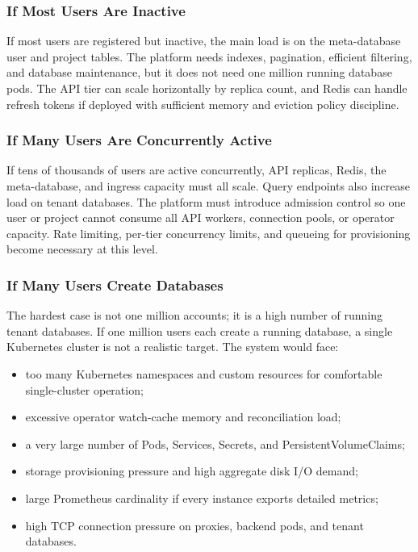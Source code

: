 \subsubsection{If Most Users Are Inactive}
If most users are registered but inactive, the main load is on the meta-database user and project tables. The platform needs indexes, pagination, efficient filtering, and database maintenance, but it does not need one million running database pods. The API tier can scale horizontally by replica count, and Redis can handle refresh tokens if deployed with sufficient memory and eviction policy discipline.

\subsubsection{If Many Users Are Concurrently Active}
If tens of thousands of users are active concurrently, API replicas, Redis, the meta-database, and ingress capacity must all scale. Query endpoints also increase load on tenant databases. The platform must introduce admission control so one user or project cannot consume all API workers, connection pools, or operator capacity. Rate limiting, per-tier concurrency limits, and queueing for provisioning become necessary at this level.

\subsubsection{If Many Users Create Databases}
The hardest case is not one million accounts; it is a high number of running tenant databases. If one million users each create a running database, a single Kubernetes cluster is not a realistic target. The system would face:

\begin{itemize}
    \item too many Kubernetes namespaces and custom resources for comfortable single-cluster operation;
    \item excessive operator watch-cache memory and reconciliation load;
    \item a very large number of Pods, Services, Secrets, and PersistentVolumeClaims;
    \item storage provisioning pressure and high aggregate disk I/O demand;
    \item large Prometheus cardinality if every instance exports detailed metrics;
    \item high TCP connection pressure on proxies, backend pods, and tenant databases.
\end{itemize}

